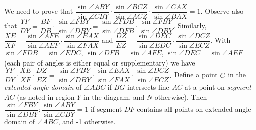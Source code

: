 \documentclass[11pt,a4paper]{article}
\begin{document}
We need to prove that $\dfrac{\sin\angle ABY}{\sin\angle CBY}\cdot\dfrac{\sin\angle BCZ}{\sin\angle ACZ}\cdot\dfrac{\sin\angle CAX}{\sin\angle BAX}=1$. Observe also that $\dfrac{YF}{DY}=\dfrac{BF}{DB}\cdot\dfrac{\sin\angle FBY}{\sin\angle DBY}=\dfrac{\sin\angle FDB}{\sin\angle DFB}\cdot\dfrac{\sin\angle FBY}{\sin\angle DBY}$. Similarly, $\dfrac{XE}{XF}=\dfrac{\sin\angle AFE}{\sin\angle AEF}\cdot\dfrac{\sin\angle EAX}{\sin\angle FAX}$ and $\dfrac{DZ}{EZ}=\dfrac{\sin\angle DEC}{\sin\angle EDC}\cdot \dfrac{\sin\angle DCZ}{\sin\angle ECZ}$. With $\sin\angle FDB=\sin\angle EDC$, $\sin\angle DFB=\sin\angle AFE$, $\sin\angle DEC=\sin\angle AEF$ (each pair of angles is either equal or supplementary) we have $\dfrac{YF}{DY}\cdot\dfrac{XE}{XF}\cdot\dfrac{DZ}{EZ}=\dfrac{\sin\angle FBY}{\sin\angle DBY}\cdot\dfrac{\sin\angle EAX}{\sin\angle FAX}\cdot \dfrac{\sin\angle DCZ}{\sin\angle ECZ}.$ Define a point $G$ in the \emph{extended angle domain} of $\angle ABC$ if $BG$ intersects line $AC$ at a point on \emph{segment} $AC$ (as noted in region $Y$ in the diagram, and $N$ otherwise). Then $\dfrac{\sin\angle FBY}{\sin\angle DBY}:\dfrac{\sin\angle ABY}{\sin\angle CBY}=1$ if segment $DF$ contains all points on extended angle domain of $\angle ABC$, and -1 otherwise.
\end{document}
